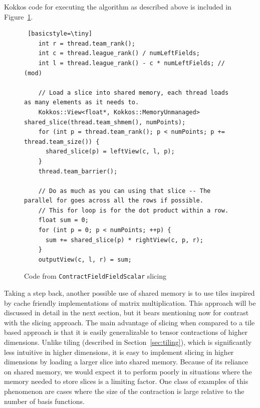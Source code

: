     Kokkos code for executing the algorithm as described above is included in Figure~\ref{lst:ContractFieldFieldScalarSlice}. 

\begin{figure}[ht]
    \begin{lstlisting} [basicstyle=\tiny]
    int r = thread.team_rank();
    int c = thread.league_rank() / numLeftFields;
    int l = thread.league_rank() - c * numLeftFields; // (mod)

    // Load a slice into shared memory, each thread loads as many elements as it needs to.
    Kokkos::View<float*, Kokkos::MemoryUnmanaged> shared_slice(thread.team_shmem(), numPoints);
    for (int p = thread.team_rank(); p < numPoints; p += thread.team_size()) {
      shared_slice(p) = leftView(c, l, p);
    }
    thread.team_barrier();

    // Do as much as you can using that slice -- The parallel for goes across all the rows if possible.
    // This for loop is for the dot product within a row.
    float sum = 0;
    for (int p = 0; p < numPoints; ++p) {
      sum += shared_slice(p) * rightView(c, p, r);
    }
    outputView(c, l, r) = sum;

   \end{lstlisting}
\caption{Code from \texttt{ContractFieldFieldScalar} slicing
\label{lst:ContractFieldFieldScalarSlice}} 
\end{figure}

    Taking a step back, another possible use of shared memory is to use tiles inspired
    by cache friendly implementations of matrix multiplication. This approach will be discussed
    in detail in the next section, but it bears mentioning now for contrast with the slicing approach. 
    The main advantage of slicing when compared to a tile based approach is that it is easily generalizable to
tensor contractions of higher dimensions. Unlike tiling (described in Section~\ref{sec:tiling}), which is significantly
less intuitive in higher dimensions, it is easy to implement slicing in higher
dimensions by loading a larger slice into shared memory. Because of its
reliance on shared memory, we would expect it to perform poorly in situations where the memory
needed to store slices is a limiting factor. One class of examples of this phenomenon are cases where the size of the contraction is large relative to the number of basis functions. 

